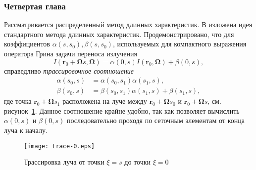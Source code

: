 \subsubsection*{Четвертая глава}
Рассматривается распределенный метод длинных характеристик. В  изложена идея стандартного метода длинных характеристик. 
Продемонстрировано, что для коэффициентов $\alpha(s, s_0), \beta(s, s_0)$, используемых для компактного выражения оператора Грина задачи переноса излучения
\[
I(\mathbf r_0 + \boldsymbol \Omega s, \boldsymbol \Omega) = 
\alpha(0, s) I(\mathbf r_0, \boldsymbol \Omega) + \beta(0, s),
\]
справедливо \emph{трассировочное соотношение}
\[\begin{aligned}
\alpha(s_0, s) &= \alpha(s_0, s_1) \alpha(s_1, s),\\
\beta(s_0, s) &= \beta(s_0, s_1) \alpha(s_1, s) + \beta(s_1, s),
\end{aligned}
\]
где точка $\mathbf r_0 + \boldsymbol \Omega s_1$ расположена на луче между $\mathbf r_0 + \boldsymbol \Omega s_0$ и $\mathbf r_0 + \boldsymbol \Omega s$, см. рисунок~\ref{fig:trace}. Данное соотношение крайне удобно, так как позволяет вычислить $\alpha(0, s)$ и $\beta(0, s)$ последовательно проходя по сеточным элементам от конца луча к началу.
\begin{figure}[ht!]
\centering
\texttt{[image: trace-0.eps]}
\caption{Трассировка луча от точки $\xi = s$ до точки $\xi = 0$}
\label{fig:trace}
\end{figure}

